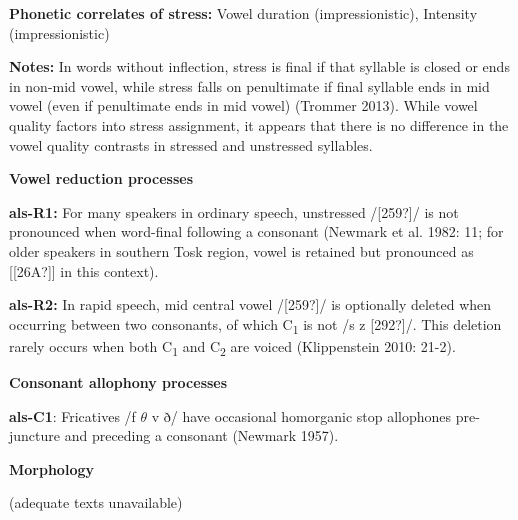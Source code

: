 \begin{styleBody}
\textbf{Phonetic correlates of stress: }Vowel duration (impressionistic), Intensity (impressionistic)
\end{styleBody}

\begin{styleBody}
\textbf{Notes:} In words without inflection, stress is final if that syllable is closed or ends in non-mid vowel, while stress falls on penultimate if final syllable ends in mid vowel (even if penultimate ends in mid vowel) (Trommer 2013). While vowel quality factors into stress assignment, it appears that there is no difference in the vowel quality contrasts in stressed and unstressed syllables.
\end{styleBody}

\begin{styleBody}
\textbf{Vowel reduction processes}
\end{styleBody}

\begin{styleBody}
\textbf{als-R1:} For many speakers in ordinary speech, unstressed /[259?]/ is not pronounced when word-final following a consonant (Newmark et al. 1982: 11; for older speakers in southern Tosk region, vowel is retained but pronounced as [[26A?]] in this context).
\end{styleBody}

\begin{styleBody}
\textbf{als-R2:} In rapid speech, mid central vowel /[259?]/ is optionally deleted when occurring between two consonants, of which C\textsubscript{1} is not /s z [292?]/. This deletion rarely occurs when both C\textsubscript{1} and C\textsubscript{2} are voiced (Klippenstein 2010: 21-2).
\end{styleBody}

\begin{styleBody}
\textbf{Consonant allophony processes}
\end{styleBody}

\begin{styleBody}
\textbf{als-C1}: Fricatives /f $\theta $ v ð/ have occasional homorganic stop allophones pre-juncture and preceding a consonant (Newmark 1957).
\end{styleBody}

\begin{styleBody}
\textbf{Morphology}
\end{styleBody}

\begin{styleBody}
(adequate texts unavailable)
\end{styleBody}

